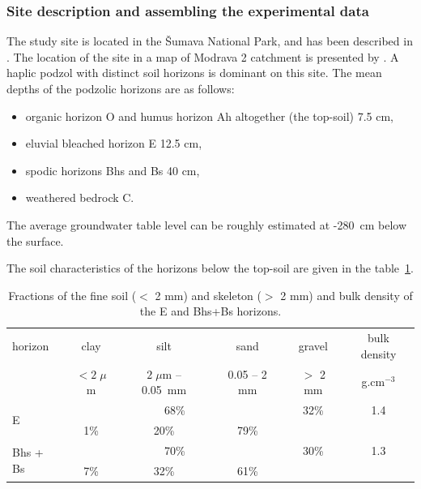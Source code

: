 \documentclass[review,times,3p,twocolumn,10pt]{elsarticle}
\newcommand{\fs}{\footnotesize}
\begin{document}
\subsubsection{Site description and assembling the experimental data}%
\label{site}
The study site is located in the \v{S}umava National Park, and has been described in \citep{Jacka1}. The location of the site in a map of Modrava 2 catchment is presented by \cite{Jacka2}.
A haplic podzol with distinct soil horizons is dominant on this site. The mean depths of the podzolic horizons are as follows:
\begin{itemize}
\item organic horizon O and humus horizon Ah altogether (the top-soil) 7.5 cm, 
\item eluvial bleached horizon E 12.5 cm, 
\item spodic horizons Bhs and Bs 40 cm,
\item weathered bedrock C.
\end{itemize}
The average groundwater table level can be roughly estimated at -280~cm below the surface. 

The soil characteristics of the horizons below the top-soil %
are given in the table~\ref{tab:soiltxt}.

%

 \begin{table}[ht]
 \fs
\centering
 		\caption{Fractions of the fine soil ($<$ 2 mm) and skeleton ($>$ 2 mm) and bulk density of the E and Bhs+Bs horizons.}
 			\begin{tabular}{l c  c  c  c  c}
 				\toprule
 				horizon & clay & silt & sand  & gravel & bulk density  \\ 
 				&  $<2\;\mu$m & $2\;\mu$m -- 0.05~mm & 0.05 -- 2 mm & $>$ 2 mm & g.cm$^{-3}$ \\ \hline
 				\multirow{2}{*}{E}      & \multicolumn{3}{c}{68\%}               & \multirow{1}{*}{32\%}  &\multirow{1}{*}{1.4}   \\ 
 				\cmidrule{2-4}
 				&  1\%               & 20\%                        & 79\%      & &\\
 				\cmidrule{2-6}
 				\multirow{2}{*}{Bhs + Bs }      & \multicolumn{3}{c}{70\%}               & \multirow{1}{*}{30\%}  &\multirow{1}{*}{1.3}   \\ 
 				\cmidrule{2-4}
 				&7\%           & 32\%                       & 61\%          & &\\
 				
 				\toprule
 			\end{tabular}
 		\label{tab:soiltxt}
 \end{table}
\end{document}
